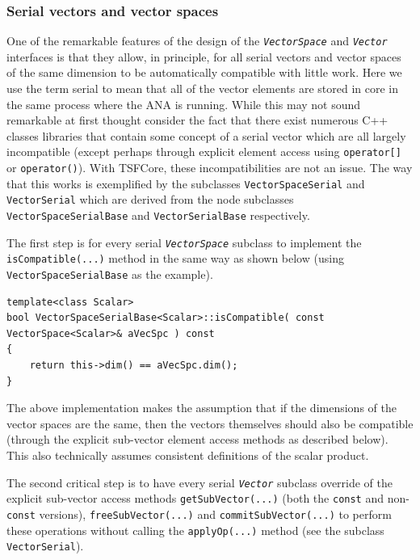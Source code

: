 \documentclass[10pt,fleqn]{article}
\begin{document}
%
\subsubsection{Serial vectors and vector spaces}
\label{tsfcore:sec:serial_vecs}
%

One of the remarkable features of the design of the
\texttt{\textit{VectorSpace}} and \texttt{\textit{Vector}} interfaces
is that they allow, in principle, for all serial vectors and vector
spaces of the same dimension to be automatically compatible with
little work.  Here we use the term serial to mean that all of the
vector elements are stored in core in the same process where the ANA
is running.  While this may not sound remarkable at first thought
consider the fact that there exist numerous C++ classes libraries
that contain some concept of a serial vector
\cite{ref:lumsdaine_and_siek_1998, ref:tnt, ref:roberts_et_al_1996,
ref:math++_1996} which are all largely incompatible (except perhaps
through explicit element access using \texttt{operator[]} or
\texttt{operator()}).  With TSFCore, these incompatibilities are not an
issue.  The way that this works is exemplified by the subclasses
\texttt{VectorSpaceSerial} and
\texttt{VectorSerial} which are derived from the node subclasses
\texttt{VectorSpace\-SerialBase} and
\texttt{VectorSerialBase} respectively.

The first step is for every serial \texttt{\textit{VectorSpace}}
subclass to implement the \texttt{isCompatible(...)}  method in the
same way as shown below (using \texttt{VectorSpaceSerialBase} as the
example).

{\scriptsize\begin{verbatim}
template<class Scalar>
bool VectorSpaceSerialBase<Scalar>::isCompatible( const VectorSpace<Scalar>& aVecSpc ) const
{
    return this->dim() == aVecSpc.dim();
}
\end{verbatim}}

The above implementation makes the assumption that if the dimensions
of the vector spaces are the same, then the vectors themselves should
also be compatible (through the explicit sub-vector element access
methods as described below).  This also technically assumes consistent
definitions of the scalar product.

The second critical step is to have every serial
\texttt{\textit{Vector}} subclass override of the explicit sub-vector
access methods \texttt{getSubVector(...)} (both the \texttt{const} and
non-\texttt{const} versions), \texttt{freeSubVector(...)} and
\texttt{commitSubVector(...)} to perform these operations without
calling the \texttt{applyOp(...)} method (see the subclass
\texttt{VectorSerial}).
\end{document}
